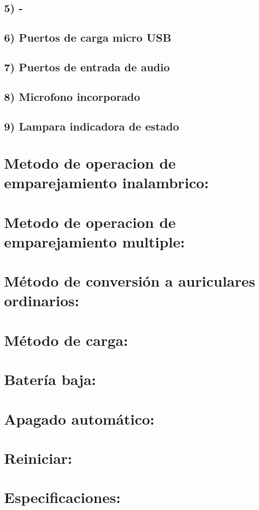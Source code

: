 \documentclass[12pt, letterpaper]{article}
\begin{document}
               \subsection{5) -}
               \subsection{6) Puertos de carga micro USB}
               \subsection{7) Puertos de entrada de audio}
               \subsection{8) Microfono incorporado}
               \subsection{9) Lampara indicadora de estado}
          \section{Metodo de operacion de emparejamiento inalambrico:}
          \section{Metodo de operacion de emparejamiento multiple:}
          \section{Método de conversión a auriculares ordinarios:}
          \section{Método de carga:}
          \section{Batería baja:}
          \section{Apagado automático:}
          \section{Reiniciar:}
          \section{Especificaciones:}
\end{document}
